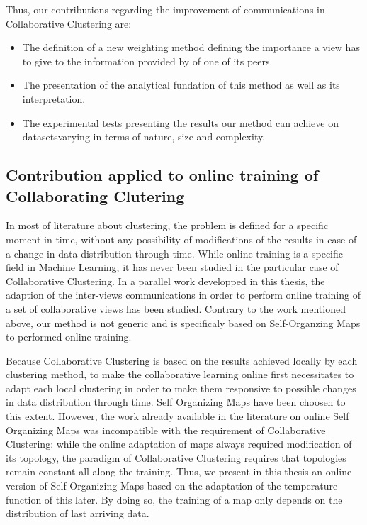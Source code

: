 Thus, our contributions regarding the improvement of communications in Collaborative Clustering are:
\begin{itemize}
    \item The definition of a new weighting method defining the importance a view has to give to the information provided by of one of its peers.
    \item The presentation of the analytical fundation of this method as well as its interpretation.
    \item The experimental tests presenting the results our method can achieve on datasetsvarying in terms of nature, size and complexity.
\end{itemize}

\subsection{Contribution applied to online training of Collaborating Clutering}

In most of literature about clustering, the problem is defined for a specific moment in time, without any possibility of modifications of the results in case of a change in data distribution through time. While online training is a specific field in Machine Learning, it has never been studied in the particular case of Collaborative Clustering. In a parallel work developped in this thesis, the adaption of the inter-views communications in order to perform online training of a set of collaborative views has been studied. Contrary to the work mentioned above, our method is not generic and is specificaly based on Self-Organzing Maps to performed online training.

Because Collaborative Clustering is based on the results achieved locally by each clustering method, to make the collaborative learning online first necessitates to adapt each local clustering in order to make them responsive to possible changes in data distribution through time. Self Organizing Maps have been choosen to this extent. However, the work already available in the literature on online Self Organizing Maps was incompatible with the requirement of Collaborative Clustering: while the online adaptation of maps always required modification of its topology, the paradigm of Collaborative Clustering requires that topologies remain constant all along the training. Thus, we present in this thesis an online version of Self Organizing Maps based on the adaptation of the temperature function of this later. By doing so, the training of a map only depends on the distribution of last arriving data.

